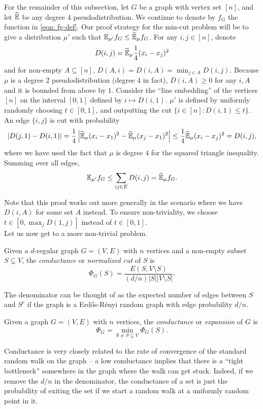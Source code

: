 	For the remainder of this subsection, let $G$ be a graph with vertex set $[n]$, and let $\widetilde{\mathbb{E}}$ be any degree $4$ pseudodistribution. We continue to denote by $f_G$ the function in \cref{eqn: fg-def}. Our proof strategy for the min-cut problem will be to give a distribution $\mu'$ such that $\mathbb{E}_{\mu'} f_G \le \widetilde{\mathbb{E}}_{\mu} f_G$. For any $i,j \in [n]$, denote
	\[ D(i,j) = \widetilde{\mathbb{E}}_{\mu} \frac{1}{4} (x_i - x_j)^2 \]
	and for non-empty $A \subseteq [n]$, $D(A,i) = D(i,A) = \min_{j \in A} D(i,j)$. Because $\mu$ is a degree $2$ pseudodistribution (degree $4$ in fact), $D(i,A) \ge 0$ for any $i,A$ and it is bounded from above by $1$. Consider the ``line embedding'' of the vertices $[n]$ on the interval $[0,1]$ defined by $i \mapsto D(i,1)$. $\mu'$ is defined by uniformly randomly choosing $t \in [0,1]$, and outputting the cut $\{i \in [n] : D(i,1) \le t\}$. An edge $\{i,j\}$ is cut with probability
	\[ |D(j,1) - D(i,1)| = \frac{1}{4} \left|\widetilde{\mathbb{E}}_{\mu} (x_i - x_1)^2 - \widetilde{\mathbb{E}}_{\mu} (x_j - x_1)^2 \right| \le \frac{1}{4} \widetilde{\mathbb{E}}_\mu (x_i - x_j)^2 = D(i,j), \]
	where we have used the fact that $\mu$ is degree $4$ for the squared triangle inequality.
	Summing over all edges,
	\[ \mathbb{E}_{\mu'} f_G \le \sum_{ij \in E} D(i,j) = \widetilde{\mathbb{E}}_{\mu} f_G. \]

	Note that this proof works out more generally in the scenario where we have $D(i,A)$ for some set $A$ instead.
	To ensure non-triviality, we choose $t \in [0,\max_j D(1,j)]$ instead of $t \in [0,1]$.\\

	Let us now get to a more non-trivial problem.

	\begin{fdef}
		Given a $d$-regular graph $G = (V,E)$ with $n$ vertices and a non-empty subset $S \subsetneq V$, the \emph{conductance} or \emph{normalized cut} of $S$ is
		\[ \Phi_G(S) = \frac{E(S,V \setminus S)}{(d/n) |S| |V \setminus S|}. \] 
	\end{fdef}
	The denominator can be thought of as the expected number of edges between $S$ and $S^c$ if the graph is a Erd\H{o}s-R\'{e}nyi random graph with edge probability $d/n$.

	\begin{fdef}
		Given a graph $G = (V,E)$ with $n$ vertices, the \emph{conductance} or \emph{expansion} of $G$ is
		\[ \Phi_G = \min_{\emptyset \ne S \subsetneq V} \Phi_G(S). \]
	\end{fdef}
	Conductance is very closely related to the rate of convergence of the standard random walk on the graph -- a low conductance implies that there is a ``tight bottleneck'' somewhere in the graph where the walk can get stuck. Indeed, if we remove the $d/n$ in the denominator, the conductance of a set is just the probability of exiting the set if we start a random walk at a uniformly random point in it.\\

